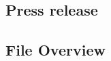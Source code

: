 \documentclass[a4paper]{article}
\begin{document}
\subsection{Press release}
\label{app:press_release}

\subsection{File Overview}
\label{app:file_overview}
\end{document}
